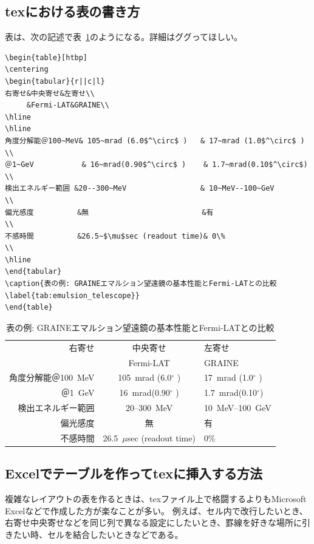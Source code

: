 \documentclass[a4j]{jsarticle}
\begin{document}
\subsection{texにおける表の書き方}
表は、次の記述で表~\ref{tab:emulsion_telescope}のようになる。詳細はググってほしい。
\begin{verbatim}
\begin{table}[htbp]
\centering
\begin{tabular}{r||c|l}
右寄せ&中央寄せ&左寄せ\\
     &Fermi-LAT&GRAINE\\
\hline
\hline
角度分解能＠100~MeV& 105~mrad (6.0$^\circ$ )   & 17~mrad (1.0$^\circ$ ) \\
＠1~GeV           & 16~mrad(0.90$^\circ$ )    & 1.7~mrad(0.10$^\circ$) \\
検出エネルギー範囲 &20--300~MeV                 & 10~MeV--100~GeV        \\
偏光感度          &無                          &有                      \\
不感時間          &26.5~$\mu$sec (readout time)& 0\%                    \\
\hline
\end{tabular}
\caption{表の例: GRAINEエマルション望遠鏡の基本性能とFermi-LATとの比較\label{tab:emulsion_telescope}}
\end{table}
\end{verbatim}
\begin{table}[htbp]
\centering
\begin{tabular}{r||c|l}
右寄せ&中央寄せ&左寄せ\\
     &Fermi-LAT&GRAINE\\
\hline
\hline
角度分解能＠100~MeV& 105~mrad (6.0$^\circ$ )   & 17~mrad (1.0$^\circ$ ) \\
＠1~GeV           & 16~mrad(0.90$^\circ$ )    & 1.7~mrad(0.10$^\circ$) \\
検出エネルギー範囲 &20--300~MeV                 & 10~MeV--100~GeV        \\
偏光感度          &無                          &有                      \\
不感時間          &26.5~$\mu$sec (readout time)& 0\%                    \\
\hline
\end{tabular}
\caption{表の例: GRAINEエマルション望遠鏡の基本性能とFermi-LATとの比較\label{tab:emulsion_telescope}}
\end{table}

\subsection{Excelでテーブルを作ってtexに挿入する方法}
複雑なレイアウトの表を作るときは、texファイル上で格闘するよりもMicrosoft Excelなどで作成した方が楽なことが多い。
例えば、セル内で改行したいとき、右寄せ中央寄せなどを同じ列で異なる設定にしたいとき、罫線を好きな場所に引きたい時、セルを結合したいときなどである。
\end{document}

